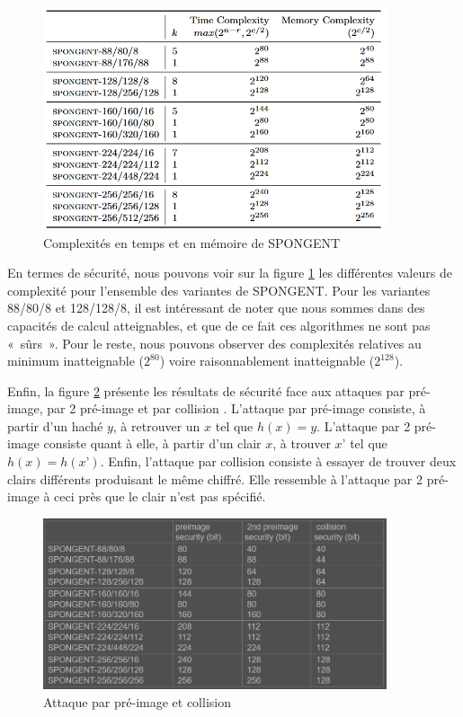 		\begin{figure}[!h]
			\centering
			\includegraphics[width=0.9\textwidth]{imgs/Spongent/timeComplexity.png}
			\caption{Complexités en temps et en mémoire de SPONGENT}
			\label{timeComplexity}
		\end{figure}

			En termes de sécurité, nous pouvons voir sur la figure \ref{timeComplexity}
		les différentes valeurs de complexité pour l’ensemble des variantes de
		SPONGENT. Pour les variantes 88/80/8 et 128/128/8, il est intéressant de
		noter que nous sommes dans des capacités de calcul atteignables, et que de
		ce fait ces algorithmes ne sont pas « sûrs ». Pour le reste, nous pouvons
		observer des complexités relatives au minimum inatteignable ($2^{80}$) voire
		raisonnablement inatteignable ($2^{128}$).

			Enfin, la figure \ref{attaquePreImage} présente les résultats de sécurité
		face aux attaques par pré-image, par 2 pré-image et par collision
		\cite{googleSpongent}. L’attaque par pré-image consiste, à partir d’un haché
		$y$, à retrouver un $x$ tel que $h(x) = y$. L’attaque par 2
		pré-image consiste quant à elle, à partir d’un clair $x$, à trouver $x’$ tel
		que $h(x) = h(x’)$. Enfin, l’attaque par collision consiste à essayer de
		trouver deux clairs différents produisant le même chiffré. Elle ressemble à
		l’attaque par 2 pré-image à ceci près que le clair n’est pas
		spécifié.

		\begin{figure}[!h]
			\centering
			\includegraphics[width=0.9\textwidth, height=0.3\textheight]{imgs/Spongent/attaquePreImage.png}
			\caption{Attaque par pré-image et collision}
			\label{attaquePreImage}
		\end{figure}

